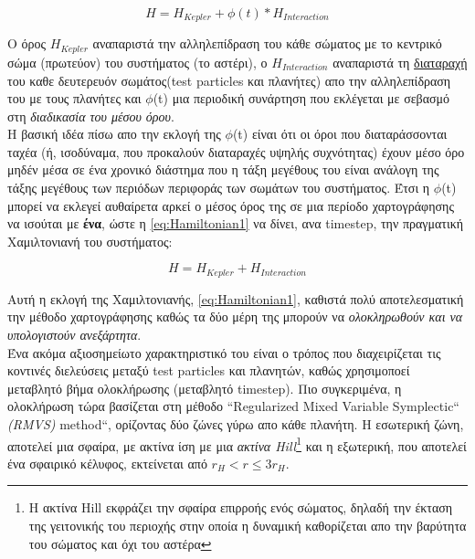 \begin{equation}\label{eq:Hamiltonian1}
  H = H_{Kepler} + {\phi}(t)*H_{Interaction}
\end{equation}

Ο όρος $H_{Kepler}$ αναπαριστά την αλληλεπίδραση του κάθε σώματος με το κεντρικό σώμα (πρωτεύον) του συστήματος (το αστέρι), ο $H_{Interaction}$  αναπαριστά τη \underline{διαταραχή} του καθε δευτερευόν σωμάτος({\en test particles} και πλανήτες) απο την αλληλεπίδραση του με τους πλανήτες και $\phi${\en (t)} μια περιοδική συνάρτηση που εκλέγεται με σεβασμό στη {\it διαδικασία του μέσου όρου}.\\

Η βασική ιδέα πίσω απο την εκλογή της $\phi${\en (t)} είναι ότι οι όροι που διαταράσσονται ταχέα (ή, ισοδύναμα, που προκαλούν διαταραχές υψηλής συχνότητας) έχουν μέσο όρο μηδέν μέσα σε ένα χρονικό διάστημα που η τάξη μεγέθους του είναι ανάλογη της τάξης μεγέθους των περιόδων περιφοράς των σωμάτων του συστήματος. Έτσι η $\phi${\en (t)} μπορεί να εκλεγεί αυθαίρετα αρκεί ο μέσος όρος της σε μια περίοδο χαρτογράφησης να ισούται με {\bf ένα}, ώστε η \eqref{eq:Hamiltonian1} να δίνει, ανα {\en timestep}, την πραγματική Χαμιλτονιανή του συστήματος:

\begin{equation}\label{eq:Hamiltonian2}
  H = H_{Kepler} + H_{Interaction}
\end{equation}

Αυτή η εκλογή της Χαμιλτονιανής, \eqref{eq:Hamiltonian1}, καθιστά πολύ αποτελεσματική την μέθοδο χαρτογράφησης καθώς τα δύο μέρη της μπορούν να {\it ολοκληρωθούν και να υπολογιστούν ανεξάρτητα}.\\

Ένα ακόμα αξιοσημείωτο χαρακτηριστικό του {} είναι ο τρόπος που διαχειρίζεται τις κοντινές διελεύσεις μεταξύ {\en test particles} και πλανητών, καθώς χρησιμοποεί μεταβλητό βήμα ολοκλήρωσης (μεταβλητό {\en timestep}). Πιο συγκεριμένα, η ολοκλήρωση τώρα βασίζεται στη μέθοδο {\en ``Regularized Mixed Variable Symplectic``\cite{levison1994long} {\it (RMVS)} method``}, ορίζοντας δύο ζώνες γύρω απο κάθε πλανήτη.
Η εσωτερική ζώνη, αποτελεί μια σφαίρα, με ακτίνα ίση με μια {\it ακτίνα {\en Hill}}\footnote{Η ακτίνα {\en Hill} εκφράζει την σφαίρα επιρροής ενός σώματος, δηλαδή την έκταση της γειτονικής του περιοχής στην οποία η δυναμική καθορίζεται απο την βαρύτητα του σώματος και όχι του αστέρα} και η εξωτερική, που αποτελεί ένα σφαιρικό κέλυφος, εκτείνεται από $r_{H}<r\leq3r_{H}$.\\

